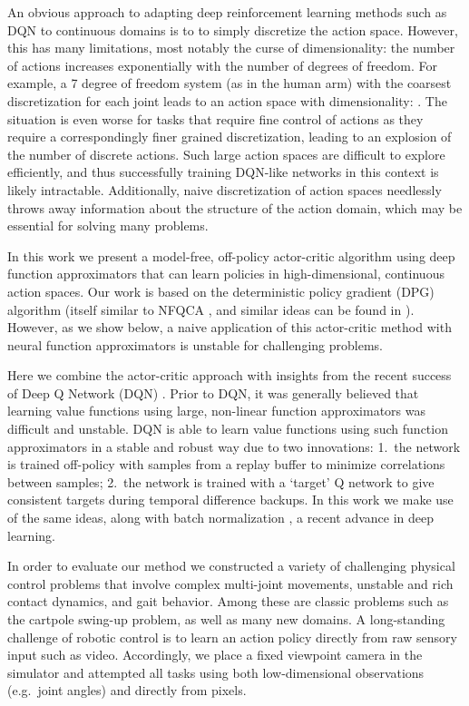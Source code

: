 \documentclass{article} \usepackage{iclr2016_conference,times}
\begin{document}
An obvious approach to adapting deep reinforcement learning
methods such as DQN to continuous
domains is to to simply discretize the action space. However, this
has many limitations, most notably the curse of dimensionality:
the number of actions increases exponentially
with the number of degrees of freedom. For example, a 7 degree of
freedom system (as in the human arm) with the coarsest discretization
 for each joint leads to an
action space with dimensionality: .  The situation is even
worse for tasks that require fine control of actions as they require
a correspondingly finer grained discretization, leading to an
explosion of the number of discrete actions. Such large action spaces
are difficult to explore efficiently, and thus successfully training
DQN-like networks in this context is likely intractable.
Additionally, naive discretization of action spaces needlessly throws
away information about the structure of the action domain, which may be
essential for solving many problems.

In this work we present a model-free, off-policy actor-critic
algorithm using deep function approximators that can learn policies
in high-dimensional, continuous action spaces.  Our work is
based on the
deterministic policy gradient (DPG)
algorithm \citep{silver2014deterministic} (itself similar to NFQCA
\citep{hafner2011reinforcement}, and similar ideas can be found in
\citep{prokhorov1997adaptive}). However, as we show below,
a naive application of this actor-critic method with
neural function approximators is unstable for challenging problems.

Here we combine the actor-critic approach with insights from the
recent success of Deep Q Network (DQN) \citep{mnih2013playing,
  mnih2015human}.  Prior to DQN, it was generally believed that
learning value functions using large, non-linear function
approximators was difficult and unstable.  DQN is able to learn value
functions using such function approximators in a stable and robust way
due to two innovations: 1.\ the network is trained off-policy with
samples from a replay buffer to minimize correlations between samples;
2.\ the network is trained with a ‘target’ Q network to give
consistent targets during temporal difference backups.  In this work
we make use of the same ideas, along with batch normalization
\citep{ioffe2015batch}, a recent advance in deep learning.





In order to evaluate our method we constructed a variety of challenging physical control problems
that involve complex multi-joint movements, unstable and rich contact
dynamics, and gait behavior.  Among these are classic
problems such as the cartpole swing-up problem, as well as many new
domains.
A long-standing
challenge of robotic control is to learn an action policy directly from raw
sensory input such as video. Accordingly, we place a fixed viewpoint
camera in the simulator and attempted all tasks
using both low-dimensional observations (e.g.\ joint angles)
and directly from pixels.
\end{document}
